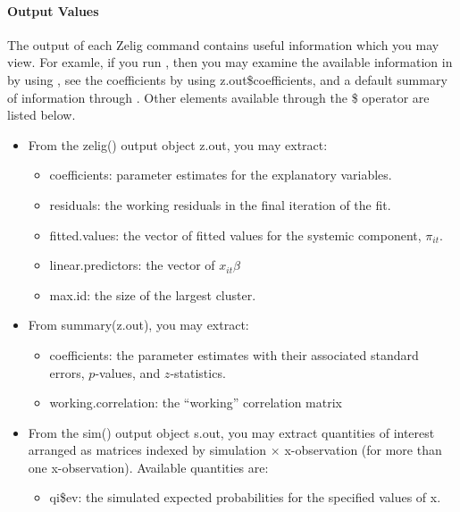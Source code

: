 \documentclass[letterpaper,10pt,english]{sphinxmanual}
\begin{document}
\paragraph{Output Values}
\label{zelig-probitgee:output-values}
The output of each Zelig command contains useful information which you
may view. For examle, if you run
, then you may
examine the available information in  by using
, see the coefficients by using z.out\$coefficients, and
a default summary of information through . Other
elements available through the \$ operator are listed below.
\begin{itemize}
\item {} 
From the zelig() output object z.out, you may extract:
\begin{itemize}
\item {} 
coefficients: parameter estimates for the explanatory variables.

\item {} 
residuals: the working residuals in the final iteration of the
fit.

\item {} 
fitted.values: the vector of fitted values for the systemic
component, \(\pi_{it}\).

\item {} 
linear.predictors: the vector of \(x_{it}\beta\)

\item {} 
max.id: the size of the largest cluster.

\end{itemize}

\item {} 
From summary(z.out), you may extract:
\begin{itemize}
\item {} 
coefficients: the parameter estimates with their associated
standard errors, \(p\)-values, and \(z\)-statistics.

\item {} 
working.correlation: the “working” correlation matrix

\end{itemize}

\item {} 
From the sim() output object s.out, you may extract quantities of
interest arranged as matrices indexed by simulation \(\times\)
x-observation (for more than one x-observation). Available quantities
are:
\begin{itemize}
\item {} 
qi\$ev: the simulated expected probabilities for the specified
values of x.


\end{itemize}
\end{itemize}
\end{document}
